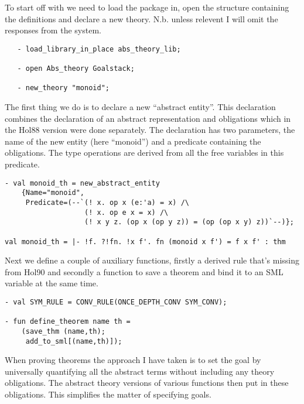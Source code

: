 To start off with we need to load the package in, open the
structure containing the definitions and declare a new theory.
N.b. unless relevent I will omit the responses from the system.

\begin{small}
\begin{verbatim}
   - load_library_in_place abs_theory_lib;

   - open Abs_theory Goalstack;

   - new_theory "monoid";
\end{verbatim}
\end{small}

The first thing we do is to declare a new ``abstract entity''. This
declaration combines the declaration of an abstract representation and
obligations which in the Hol88 version were done separately. The
declaration has two parameters, the name of the new entity (here
``monoid'') and a predicate containing the obligations. The type
operations are derived from all the free variables in this predicate.

\begin{small}
\begin{verbatim}
- val monoid_th = new_abstract_entity
    {Name="monoid",
     Predicate=(--`(! x. op x (e:'a) = x) /\
                   (! x. op e x = x) /\
                   (! x y z. (op x (op y z)) = (op (op x y) z))`--)};

val monoid_th = |- !f. ?!fn. !x f'. fn (monoid x f') = f x f' : thm
\end{verbatim}
\end{small}  

Next we define a couple of auxiliary functions, firstly a derived rule
that's missing from Hol90 and secondly a function to save a theorem and
bind it to an SML variable at the same time.

\begin{small}
\begin{verbatim}
- val SYM_RULE = CONV_RULE(ONCE_DEPTH_CONV SYM_CONV);

- fun define_theorem name th =
    (save_thm (name,th);
     add_to_sml[(name,th)]);
\end{verbatim}
\end{small}


When proving theorems the approach I have taken is to set the goal by
universally quantifying all the abstract terms without including any theory
obligations. The abstract theory versions of various functions then
put in these obligations. This simplifies the matter of specifying
goals.


